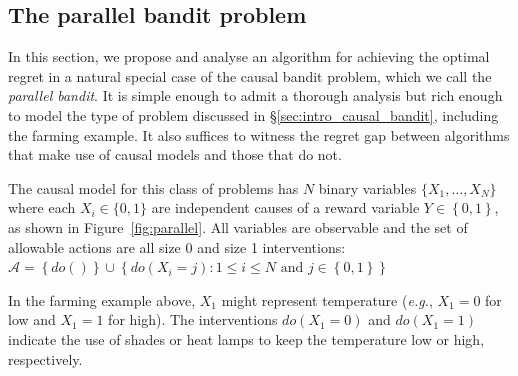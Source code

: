 \documentclass[11pt,a4paper,twoside]{report}
\newcommand{\eg}{\textit{e.g.}}
\newcommand{\set}[1]{\left\{#1\right\}}
\theoremstyle{plain}
\theoremstyle{definition}
\begin{document}
\subsection{The parallel bandit problem}
\label{sec:simple-regret}
In this section, we propose and analyse an algorithm for achieving the optimal regret in a natural special case of the causal bandit problem, which we call the {\it parallel bandit}.
It is simple enough to admit a thorough analysis but rich enough to model the type of problem discussed in \S\ref{sec:intro_causal_bandit}, including the farming example. It also suffices to witness the regret gap between algorithms that make use of causal models and those that do not.

The causal model for this class of problems has $N$ binary variables $\{ X_1, \ldots, X_N \}$ where each $X_i \in \{0,1\}$ are independent causes of a reward variable $Y \in \set{0,1}$, as shown in Figure~\ref{fig:parallel}. All variables are observable and the set of allowable actions are all size 0 and size 1 interventions: $\mathcal{A} = \set{do()} \cup \set{ do(X_i = j) \colon 1 \leq i \leq N \text{ and } j \in \set{0,1}}$

In the farming example above, $X_1$ might represent temperature (\eg, $X_1=0$ for low and $X_1=1$ for high). The interventions $do(X_1 = 0)$ and $do(X_1 = 1)$ indicate the use of shades or heat lamps to keep the temperature low or high, respectively.
\end{document}
